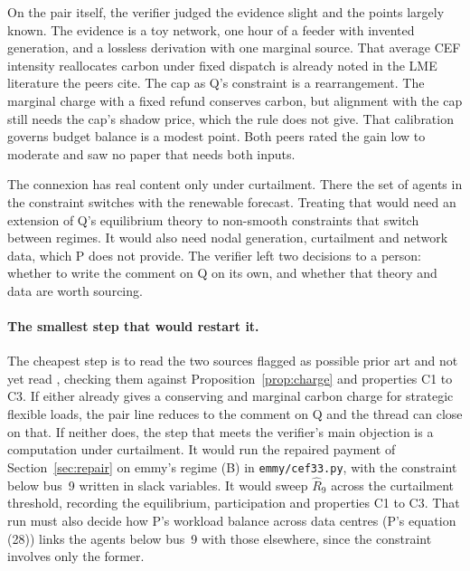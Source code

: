 \documentclass{article}
\begin{document}
On the pair itself, the verifier judged the evidence slight and the points largely known.
The evidence is a toy network, one hour of a feeder with invented generation, and a lossless derivation with one marginal source.
That average CEF intensity reallocates carbon under fixed dispatch is already noted in the LME literature the peers cite.
The cap as Q's constraint is a rearrangement.
The marginal charge with a fixed refund conserves carbon, but alignment with the cap still needs the cap's shadow price, which the rule does not give.
That calibration governs budget balance is a modest point.
Both peers rated the gain low to moderate and saw no paper that needs both inputs.

The connexion has real content only under curtailment.
There the set of agents in the constraint switches with the renewable forecast.
Treating that would need an extension of Q's equilibrium theory to non-smooth constraints that switch between regimes.
It would also need nodal generation, curtailment and network data, which P does not provide.
The verifier left two decisions to a person: whether to write the comment on Q on its own, and whether that theory and data are worth sourcing.

\paragraph{The smallest step that would restart it.}
The cheapest step is to read the two sources flagged as possible prior art and not yet read \cite{arxiv260319530,su18094398}, checking them against Proposition~\ref{prop:charge} and properties C1 to C3.
If either already gives a conserving and marginal carbon charge for strategic flexible loads, the pair line reduces to the comment on Q and the thread can close on that.
If neither does, the step that meets the verifier's main objection is a computation under curtailment.
It would run the repaired payment of Section~\ref{sec:repair} on emmy's regime (B) in \texttt{emmy/cef33.py}, with the constraint below bus~9 written in slack variables.
It would sweep \(\hat R_9\) across the curtailment threshold, recording the equilibrium, participation and properties C1 to C3.
That run must also decide how P's workload balance across data centres (P's equation (28)) links the agents below bus~9 with those elsewhere, since the constraint involves only the former.



\end{document}
